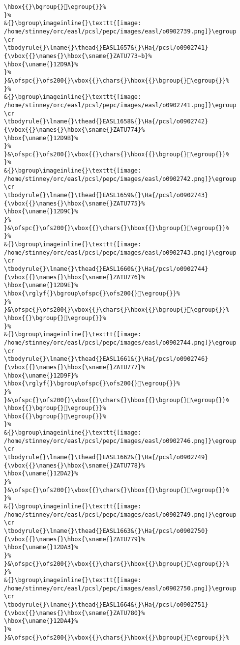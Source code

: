\begin{verbatim}
\hbox{{}\bgroup{}𒶙\egroup{}}%
}%
&{}\bgroup\imageinline{}\texttt{[image: /home/stinney/orc/easl/pcsl/pepc/images/easl/o0902739.png]}\egroup
\cr
\tbodyrule{}\lname{}\thead{}EASL1657&{}\Ha{/pcsl/o0902741}{\vbox{{}\names{}\hbox{\sname{}ZATU773∼b}%
\hbox{\uname{}12D9A}%
}%
}&\ofspc{}\ofs200{}\vbox{{}\chars{}\hbox{{}\bgroup{}𒶚\egroup{}}%
}%
&{}\bgroup\imageinline{}\texttt{[image: /home/stinney/orc/easl/pcsl/pepc/images/easl/o0902741.png]}\egroup
\cr
\tbodyrule{}\lname{}\thead{}EASL1658&{}\Ha{/pcsl/o0902742}{\vbox{{}\names{}\hbox{\sname{}ZATU774}%
\hbox{\uname{}12D9B}%
}%
}&\ofspc{}\ofs200{}\vbox{{}\chars{}\hbox{{}\bgroup{}𒶛\egroup{}}%
}%
&{}\bgroup\imageinline{}\texttt{[image: /home/stinney/orc/easl/pcsl/pepc/images/easl/o0902742.png]}\egroup
\cr
\tbodyrule{}\lname{}\thead{}EASL1659&{}\Ha{/pcsl/o0902743}{\vbox{{}\names{}\hbox{\sname{}ZATU775}%
\hbox{\uname{}12D9C}%
}%
}&\ofspc{}\ofs200{}\vbox{{}\chars{}\hbox{{}\bgroup{}𒶜\egroup{}}%
}%
&{}\bgroup\imageinline{}\texttt{[image: /home/stinney/orc/easl/pcsl/pepc/images/easl/o0902743.png]}\egroup
\cr
\tbodyrule{}\lname{}\thead{}EASL1660&{}\Ha{/pcsl/o0902744}{\vbox{{}\names{}\hbox{\sname{}ZATU776}%
\hbox{\uname{}12D9E}%
\hbox{\rglyf{}\bgroup\ofspc{}\ofs200{}𒶞\egroup{}}%
}%
}&\ofspc{}\ofs200{}\vbox{{}\chars{}\hbox{{}\bgroup{}𒶞\egroup{}}%
\hbox{{}\bgroup{}𒶝\egroup{}}%
}%
&{}\bgroup\imageinline{}\texttt{[image: /home/stinney/orc/easl/pcsl/pepc/images/easl/o0902744.png]}\egroup
\cr
\tbodyrule{}\lname{}\thead{}EASL1661&{}\Ha{/pcsl/o0902746}{\vbox{{}\names{}\hbox{\sname{}ZATU777}%
\hbox{\uname{}12D9F}%
\hbox{\rglyf{}\bgroup\ofspc{}\ofs200{}𒶟\egroup{}}%
}%
}&\ofspc{}\ofs200{}\vbox{{}\chars{}\hbox{{}\bgroup{}𒶟\egroup{}}%
\hbox{{}\bgroup{}𒶠\egroup{}}%
\hbox{{}\bgroup{}𒶡\egroup{}}%
}%
&{}\bgroup\imageinline{}\texttt{[image: /home/stinney/orc/easl/pcsl/pepc/images/easl/o0902746.png]}\egroup
\cr
\tbodyrule{}\lname{}\thead{}EASL1662&{}\Ha{/pcsl/o0902749}{\vbox{{}\names{}\hbox{\sname{}ZATU778}%
\hbox{\uname{}12DA2}%
}%
}&\ofspc{}\ofs200{}\vbox{{}\chars{}\hbox{{}\bgroup{}𒶢\egroup{}}%
}%
&{}\bgroup\imageinline{}\texttt{[image: /home/stinney/orc/easl/pcsl/pepc/images/easl/o0902749.png]}\egroup
\cr
\tbodyrule{}\lname{}\thead{}EASL1663&{}\Ha{/pcsl/o0902750}{\vbox{{}\names{}\hbox{\sname{}ZATU779}%
\hbox{\uname{}12DA3}%
}%
}&\ofspc{}\ofs200{}\vbox{{}\chars{}\hbox{{}\bgroup{}𒶣\egroup{}}%
}%
&{}\bgroup\imageinline{}\texttt{[image: /home/stinney/orc/easl/pcsl/pepc/images/easl/o0902750.png]}\egroup
\cr
\tbodyrule{}\lname{}\thead{}EASL1664&{}\Ha{/pcsl/o0902751}{\vbox{{}\names{}\hbox{\sname{}ZATU780}%
\hbox{\uname{}12DA4}%
}%
}&\ofspc{}\ofs200{}\vbox{{}\chars{}\hbox{{}\bgroup{}𒶤\egroup{}}%

\end{verbatim}
